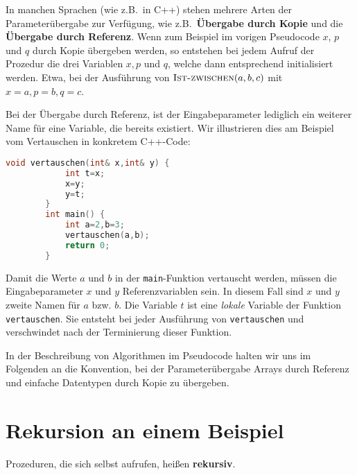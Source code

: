 \begin{bem} 
In manchen Sprachen (wie z.B.~in C++) stehen mehrere Arten der Parameterübergabe zur Verfügung, wie z.B.~\textbf{Übergabe durch Kopie} und die \textbf{Übergabe durch Referenz}. Wenn zum Beispiel im vorigen Pseudocode $x$, $p$ und $q$ durch Kopie übergeben werden, so entstehen bei jedem Aufruf der Prozedur die drei Variablen $x, p$ und $q$, welche dann entsprechend initialisiert werden. Etwa, bei der Ausführung von $\mathop{\text{\textsc{Ist-zwischen}}}(a,b,c)$ mit $x=a, p=b, q=c$. 
\end{bem} 

\begin{bsp} 
Bei der Übergabe durch Referenz, ist der Eingabeparameter lediglich ein weiterer Name für eine Variable, die bereits existiert. Wir illustrieren dies am Beispiel vom Vertauschen in konkretem C++-Code: 

\begin{center}
	\small 
	\begin{lstlisting}[language=C++]
		void vertauschen(int& x,int& y) {
			int t=x;
			x=y;
			y=t;
		}
		int main() {
			int a=2,b=3;
			vertauschen(a,b);
			return 0;
		}
	\end{lstlisting}
\end{center}

Damit die Werte $a$ und $b$ in der \texttt{main}-Funktion vertauscht werden, müssen die Eingabeparameter $x$ und $y$ Referenzvariablen sein. In diesem Fall sind $x$ und $y$ zweite Namen für $a$ bzw. $b$. Die Variable $t$ ist eine \emph{lokale} Variable der Funktion \texttt{vertauschen}. Sie entsteht bei jeder Ausführung von \texttt{vertauschen} und verschwindet nach der Terminierung dieser Funktion. 
\end{bsp} 

\begin{bem}
	In der Beschreibung von Algorithmen im Pseudocode halten wir uns im Folgenden an die Konvention, bei der Parameterübergabe Arrays durch Referenz und einfache Datentypen durch Kopie zu übergeben.
\end{bem}

\section{Rekursion an einem Beispiel}


\begin{defn}
Prozeduren, die sich selbst aufrufen, heißen \textbf{rekursiv}. 
\end{defn} 

